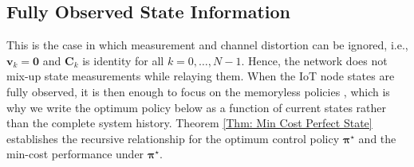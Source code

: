 \documentclass[10pt, journal, letterpaper]{IEEEtran}
\newcommand{\1}{\ensuremath{\mathbf{1}}} %
\renewcommand{\vec}[1]{\ensuremath{\boldsymbol{#1}}} %
\begin{document}
\subsection{Fully Observed State Information}

This is the case in which measurement and channel distortion can be ignored, i.e., $\vec{v}_k = \vec{0}$ and $\vec{C}_k$ is identity for all $k=0, \ldots, N-1$. Hence, the network does not mix-up state measurements while relaying them.  When the IoT node states are fully observed, it is then enough to focus on the memoryless policies \cite{Bertsekas95}, which is why we write the optimum policy below as a function of current states rather than the complete system history.  Theorem \ref{Thm: Min Cost Perfect State} establishes the recursive relationship for the optimum control policy $\vec{\pi}^\star$ and the min-cost performance under $\vec{\pi}^\star$.
\end{document}
